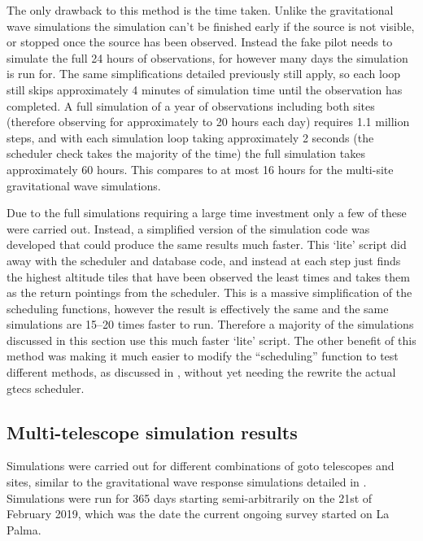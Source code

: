 \begin{colsection}
\begin{colsection}
The only drawback to this method is the time taken. Unlike the gravitational wave simulations the simulation can't be finished early if the source is not visible, or stopped once the source has been observed. Instead the fake pilot needs to simulate the full 24 hours of observations, for however many days the simulation is run for. The same simplifications detailed previously still apply, so each loop still skips approximately 4 minutes of simulation time until the observation has completed. A full simulation of a year of observations including both sites (therefore observing for approximately to 20 hours each day) requires 1.1 million steps, and with each simulation loop taking approximately 2 seconds (the scheduler check takes the majority of the time) the full simulation takes approximately 60 hours. This compares to at most 16 hours for the multi-site gravitational wave simulations.

Due to the full simulations requiring a large time investment only a few of these were carried out. Instead, a simplified version of the simulation code was developed that could produce the same results much faster. This `lite' script did away with the scheduler and database code, and instead at each step just finds the highest altitude tiles that have been observed the least times and takes them as the return pointings from the scheduler. This is a massive simplification of the scheduling functions, however the result is effectively the same and the same simulations are 15--20 times faster to run. Therefore a majority of the simulations discussed in this section use this much faster `lite' script. The other benefit of this method was making it much easier to modify the ``scheduling'' function to test different methods, as discussed in , without yet needing the rewrite the actual \gls{gtecs} scheduler.

\end{colsection}


\subsection{Multi-telescope simulation results}
\label{sec:survey_sim_results}
\begin{colsection}

Simulations were carried out for different combinations of \gls{goto} telescopes and sites, similar to the gravitational wave response simulations detailed in . Simulations were run for 365 days starting semi-arbitrarily on the 21st of February 2019, which was the date the current ongoing survey started on La Palma.


\end{colsection}
\end{colsection}
